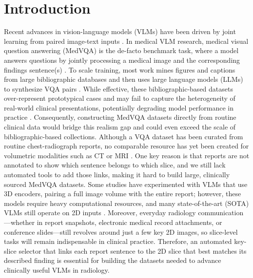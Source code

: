 \documentclass[bioengineering,article,submit,pdftex,moreauthors]{Definitions/mdpi}
\begin{document}
\section{Introduction}

Recent advances in vision-language models (VLMs) have been driven by joint learning from paired image-text inputs \cite{li_llava-next-interleave_2024,xiao_florence-2_2024,chen_internvl_2024,alayrac_flamingo_2022}. 
In medical VLM research, medical visual question answering (MedVQA) is the de-facto benchmark task, where a model answers questions by jointly processing a medical image and the corresponding findings sentence(s) \cite{lau_dataset_2018,liu_slake_2021}. 
To scale training, most work mines figures and captions from large bibliographic databases and then uses large language models (LLMs) to synthesize VQA pairs \cite{zhang_pmc-vqa_2024,li_llava-med_2023}. 
While effective, these bibliographic-based datasets over-represent prototypical cases and may fail to capture the heterogeneity of real-world clinical presentations, potentially degrading model performance in practice \cite{zhang_pmc-vqa_2024,dong_generative_2025}. 
Consequently, constructing MedVQA datasets directly from routine clinical data would bridge this realism gap and could even exceed the scale of bibliographic-based collections. 
Although a VQA dataset has been curated from routine chest-radiograph reports, no comparable resource has yet been created for volumetric modalities such as CT or MRI \cite{bae_ehrxqa_2024}. 
One key reason is that reports are not annotated to show which sentence belongs to which slice, and we still lack automated tools to add those links, making it hard to build large, clinically sourced MedVQA datasets. 
Some studies have experimented with VLMs that use 3D encoders, pairing a full image volume with the entire report; however, these models require heavy computational resources, and many state-of-the-art (SOTA) VLMs still operate on 2D inputs \cite{bai_m3d_2024,blankemeier_merlin_2024,hamamci_ct2rep_2024}. 
Moreover, everyday radiology communication—whether in report snapshots, electronic medical record attachments, or conference slides—still revolves around just a few key 2D images, so slice-level tasks will remain indispensable in clinical practice. 
Therefore, an automated key-slice selector that links each report sentence to the 2D slice that best matches its described finding is essential for building the datasets needed to advance clinically useful VLMs in radiology. 
\end{document}
